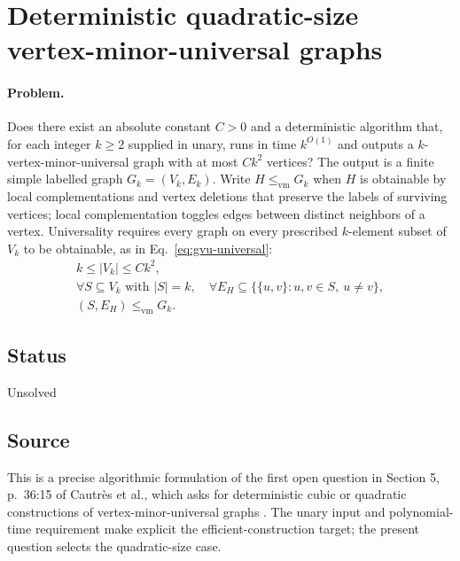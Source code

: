 \section{Deterministic quadratic-size vertex-minor-universal graphs}
\label{sec:op_4154bf4cbe0d288e}

\paragraph{Problem.}
Does there exist an absolute constant $C>0$ and a deterministic algorithm that, for each integer $k\geq2$ supplied in unary, runs in time $k^{O(1)}$ and outputs a $k$-vertex-minor-universal graph with at most $Ck^2$ vertices? The output is a finite simple labelled graph $G_k=(V_k,E_k)$. Write $H\leq_{\mathrm{vm}}G_k$ when $H$ is obtainable by local complementations and vertex deletions that preserve the labels of surviving vertices; local complementation toggles edges between distinct neighbors of a vertex. Universality requires every graph on every prescribed $k$-element subset of $V_k$ to be obtainable, as in Eq.~\eqref{eq:gvu-universal}:
\begin{equation}
\begin{gathered}
k\leq|V_k|\leq Ck^2,\\
\forall S\subseteq V_k\text{ with }|S|=k,\quad
\forall E_H\subseteq\{\{u,v\}:u,v\in S,\ u\neq v\},\\
(S,E_H)\leq_{\mathrm{vm}}G_k.
\end{gathered}
\label{eq:gvu-universal}
\end{equation}

\subsection*{Status}

Unsolved

\subsection*{Source}

This is a precise algorithmic formulation of the first open question in Section 5, p.~36:15 of Cautrès et al., which asks for deterministic cubic or quadratic constructions of vertex-minor-universal graphs . The unary input and polynomial-time requirement make explicit the efficient-construction target; the present question selects the quadratic-size case.

